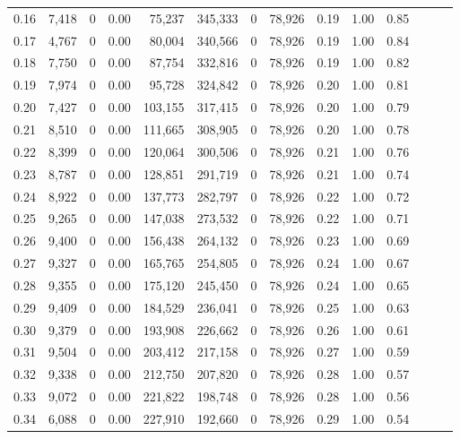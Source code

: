 \begin{tabular}{rrrrrrrrrrrrrr}
0.16 &  7,418 &      0 &  0.00 &   75,237 &  345,333 &       0 &  78,926 &  0.19 &  1.00 &      0.85 \\
0.17 &  4,767 &      0 &  0.00 &   80,004 &  340,566 &       0 &  78,926 &  0.19 &  1.00 &      0.84 \\
0.18 &  7,750 &      0 &  0.00 &   87,754 &  332,816 &       0 &  78,926 &  0.19 &  1.00 &      0.82 \\
0.19 &  7,974 &      0 &  0.00 &   95,728 &  324,842 &       0 &  78,926 &  0.20 &  1.00 &      0.81 \\
0.20 &  7,427 &      0 &  0.00 &  103,155 &  317,415 &       0 &  78,926 &  0.20 &  1.00 &      0.79 \\
0.21 &  8,510 &      0 &  0.00 &  111,665 &  308,905 &       0 &  78,926 &  0.20 &  1.00 &      0.78 \\
0.22 &  8,399 &      0 &  0.00 &  120,064 &  300,506 &       0 &  78,926 &  0.21 &  1.00 &      0.76 \\
0.23 &  8,787 &      0 &  0.00 &  128,851 &  291,719 &       0 &  78,926 &  0.21 &  1.00 &      0.74 \\
0.24 &  8,922 &      0 &  0.00 &  137,773 &  282,797 &       0 &  78,926 &  0.22 &  1.00 &      0.72 \\
0.25 &  9,265 &      0 &  0.00 &  147,038 &  273,532 &       0 &  78,926 &  0.22 &  1.00 &      0.71 \\
0.26 &  9,400 &      0 &  0.00 &  156,438 &  264,132 &       0 &  78,926 &  0.23 &  1.00 &      0.69 \\
0.27 &  9,327 &      0 &  0.00 &  165,765 &  254,805 &       0 &  78,926 &  0.24 &  1.00 &      0.67 \\
0.28 &  9,355 &      0 &  0.00 &  175,120 &  245,450 &       0 &  78,926 &  0.24 &  1.00 &      0.65 \\
0.29 &  9,409 &      0 &  0.00 &  184,529 &  236,041 &       0 &  78,926 &  0.25 &  1.00 &      0.63 \\
0.30 &  9,379 &      0 &  0.00 &  193,908 &  226,662 &       0 &  78,926 &  0.26 &  1.00 &      0.61 \\
0.31 &  9,504 &      0 &  0.00 &  203,412 &  217,158 &       0 &  78,926 &  0.27 &  1.00 &      0.59 \\
0.32 &  9,338 &      0 &  0.00 &  212,750 &  207,820 &       0 &  78,926 &  0.28 &  1.00 &      0.57 \\
0.33 &  9,072 &      0 &  0.00 &  221,822 &  198,748 &       0 &  78,926 &  0.28 &  1.00 &      0.56 \\
0.34 &  6,088 &      0 &  0.00 &  227,910 &  192,660 &       0 &  78,926 &  0.29 &  1.00 &      0.54 \\

\end{tabular}
